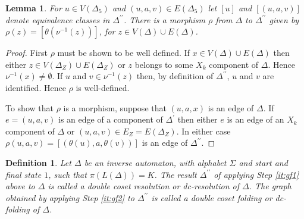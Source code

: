 \documentclass[a4paper,12pt]{article}
\newcommand{\D}{\Delta }
\renewcommand{\S}{\Sigma }
\newcommand{\nul}{\emptyset }
\newtheorem{lemma}[theorem]{Lemma}
\newtheorem{definition}[theorem]{Definition}
\numberwithin{equation}{section}
\numberwithin{figure}{section}
\begin{document}
\begin{lemma}\label{lem:resol-quot}
For $u\in V(\D_5)$  and $(u,a,v) \in E(\D_5)$ let $[u]$ and 
$[(u,a,v)]$ denote equivalence classes in $\D^{\prime\prime}$. 
There is a morphism  
$\rho$ from  $\D$ to $\D^{\prime\prime}$ given by 
$\rho(z)=[\theta(\nu^{-1}(z))]$, for $z\in V(\D)\cup E(\D)$. 
\end{lemma}
\begin{proof}
First $\rho$ must be shown to be well defined. If $x\in V(\D)\cup E(\D)$ then
either $z\in V(\D_Z)\cup E(\D_Z)$ or $z$ belongs to  some $X_k$ component of 
$\D$. Hence 
 $\nu^{-1}(x)\neq \nul$. If 
$u$ and $v\in \nu^{-1}(z)$ then, by definition of $\D^{\prime\prime}$, 
$u$ and $v$ are identified. Hence $\rho$ is well-defined. 

To show that $\rho$ is a morphism, suppose that $(u,a,x)$ is an edge
of $\D$. If $e=(u,a,v)$ is an edge of a component of $\D^\prime$ then 
either $e$ is an edge of an $X_k$ component of $\D$ or 
 $(u,a,v)\in E_Z=E(\D_Z)$. In either  case 
$\rho(u,a,v)=[(\theta(u),a,\theta(v))]$ is an edge of $\D^{\prime\prime}$.
\end{proof}

\begin{definition}
Let $\D$ be an inverse automaton, with alphabet $\S$ and 
start and final state $1$, such that
$\pi(L(\D))=K$. The result $\D^{\prime\prime}$ of applying Step \ref{it:gf1}
above to $\D$ is called a \emph{double coset resolution} or 
\emph{dc-resolution} of $\D$. The graph obtained by applying 
Step \ref{it:gf2} to $\D^{\prime\prime}$ is called a \emph{double
coset folding} or \emph{dc-folding} of $\D$.  
\end{definition}
\end{document}
